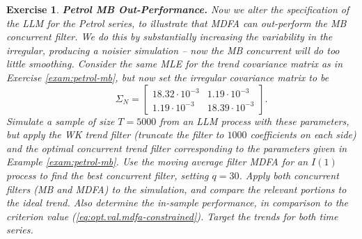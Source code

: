 \documentclass[a4paper]{book}
\newtheorem{Exercise}{Exercise}
\begin{document}
\begin{Exercise} {\bf Petrol MB Out-Performance.}  \rm
\label{exer:petrol-mb2}
 Now we alter the specification of the LLM for the Petrol series,
  to illustrate that MDFA can out-perform the MB concurrent filter.  
  We do this by substantially increasing the
 variability in the irregular, producing a noisier simulation -- now the MB concurrent will do too little smoothing.  Consider the same MLE for the trend covariance
  matrix as in Exercise \ref{exam:petrol-mb}, but now set the irregular
 covariance matrix to be
\[
   \qquad  \Sigma_{N} = \left[ \begin{array}{ll}
       18.32 \cdot 10^{-3}  &  1.19 \cdot 10^{-3}   \\
       1.19 \cdot 10^{-3}  &  18.39 \cdot 10^{-3}  \end{array} \right].
\]
 Simulate a sample of size $T=5000$ from an LLM process with these parameters,
 but apply  the WK trend filter
(truncate the filter to $1000$ coefficients on each side) and the 
 optimal concurrent trend filter  corresponding to the parameters
  given in Example \ref{exam:petrol-mb}.  
 Use the moving average filter  MDFA  for an $I(1)$ process  to find the best
 concurrent filter, setting $q= 30$.
    Apply both concurrent filters (MB and MDFA)
 to the simulation, and compare the relevant portions to the ideal trend.
 Also determine the in-sample performance, in comparison to the criterion value
 (\ref{eq:opt.val.mdfa-constrained}).   Target the trends for both time series.
\end{Exercise}
\end{document}
